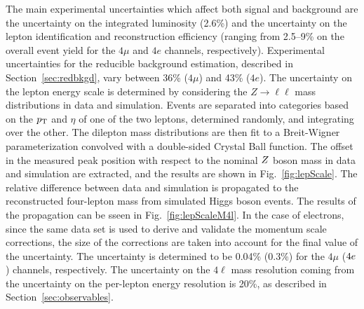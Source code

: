The main experimental uncertainties which affect both signal and background are the uncertainty on the integrated luminosity
(2.6\%) and the uncertainty on the lepton identification and reconstruction efficiency (ranging from 2.5--9\% on the 
overall event yield for the $4\mu$ 
and $4e$ channels, respectively). Experimental uncertainties for the reducible background estimation, 
described in Section~\ref{sec:redbkgd},
vary between 36\% ($4\mu$)  and 43\% ($4e$).  The uncertainty on the lepton energy scale is determined by considering the 
$Z\rightarrow\ell\ell$ mass distributions in data and simulation. Events are separated into categories based on the 
$p_{\rm{T}}$ and $\eta$ of one of the two leptons, determined randomly, and integrating over the other. The dilepton mass 
distributions are then fit to a Breit-Wigner 
parameterization convolved with a double-sided Crystal Ball function. The offset in the measured peak position with 
respect to the nominal $Z$ boson 
mass in data and simulation are extracted, and the results are shown in Fig.~\ref{fig:lepScale}. The relative difference 
between data and simulation is propagated to the reconstructed four-lepton mass 
from simulated Higgs boson events. The results of the propagation can be sseen in Fig.~\ref{fig:lepScaleM4l}.
In the case of electrons, since the same data set is used to derive and validate the 
momentum scale corrections, the size 
of the corrections are taken into account for the final value of the uncertainty.
The uncertainty is determined to be 0.04\% (0.3\%) for the  $4\mu$ ($4e$) channels, respectively. The uncertainty 
on the $4\ell$ mass resolution coming from the uncertainty on the per-lepton energy resolution is 20\%, 
as described in Section~\ref{sec:observables}.


